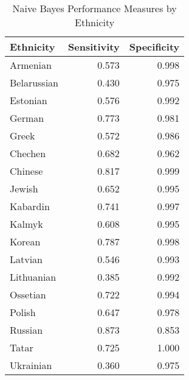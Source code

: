 \begin{table}[t]

\caption{\label{tab:sens_spec}Naive Bayes Performance Measures by Ethnicity}
\centering
\fontsize{9}{11}\selectfont
\begin{tabular}{lrr}
\toprule
Ethnicity & Sensitivity & Specificity\\
\midrule
Armenian & 0.573 & 0.998\\
Belarussian & 0.430 & 0.975\\
Estonian & 0.576 & 0.992\\
German & 0.773 & 0.981\\
Greek & 0.572 & 0.986\\
Chechen & 0.682 & 0.962\\
Chinese & 0.817 & 0.999\\
Jewish & 0.652 & 0.995\\
Kabardin & 0.741 & 0.997\\
Kalmyk & 0.608 & 0.995\\
Korean & 0.787 & 0.998\\
Latvian & 0.546 & 0.993\\
Lithuanian & 0.385 & 0.992\\
Ossetian & 0.722 & 0.994\\
Polish & 0.647 & 0.978\\
Russian & 0.873 & 0.853\\
Tatar & 0.725 & 1.000\\
Ukrainian & 0.360 & 0.975\\
\bottomrule
\end{tabular}
\end{table}